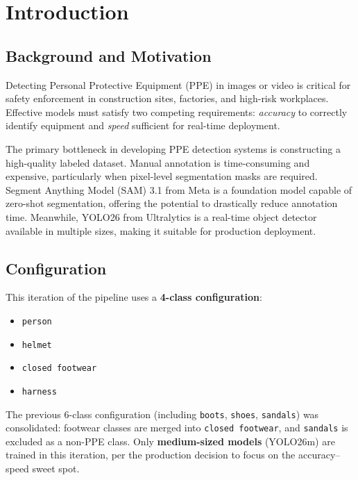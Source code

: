 \documentclass[a4paper,11pt]{article}
\begin{document}
\newpage
\tableofcontents
\newpage

\section{Introduction}

\subsection{Background and Motivation}

Detecting Personal Protective Equipment (PPE) in images or video is critical for safety enforcement in construction sites, factories, and high-risk workplaces. Effective models must satisfy two competing requirements: \emph{accuracy} to correctly identify equipment and \emph{speed} sufficient for real-time deployment.

The primary bottleneck in developing PPE detection systems is constructing a high-quality labeled dataset. Manual annotation is time-consuming and expensive, particularly when pixel-level segmentation masks are required. Segment Anything Model (SAM) 3.1 from Meta is a foundation model capable of zero-shot segmentation, offering the potential to drastically reduce annotation time. Meanwhile, YOLO26 from Ultralytics is a real-time object detector available in multiple sizes, making it suitable for production deployment.

\subsection{Configuration}

This iteration of the pipeline uses a \textbf{4-class configuration}:
\begin{itemize}[leftmargin=2cm, itemsep=2pt]
  \item \texttt{person}
  \item \texttt{helmet}
  \item \texttt{closed footwear}
  \item \texttt{harness}
\end{itemize}

The previous 6-class configuration (including \texttt{boots}, \texttt{shoes}, \texttt{sandals}) was consolidated: footwear classes are merged into \texttt{closed footwear}, and \texttt{sandals} is excluded as a non-PPE class. Only \textbf{medium-sized models} (YOLO26m) are trained in this iteration, per the production decision to focus on the accuracy--speed sweet spot.
\end{document}
